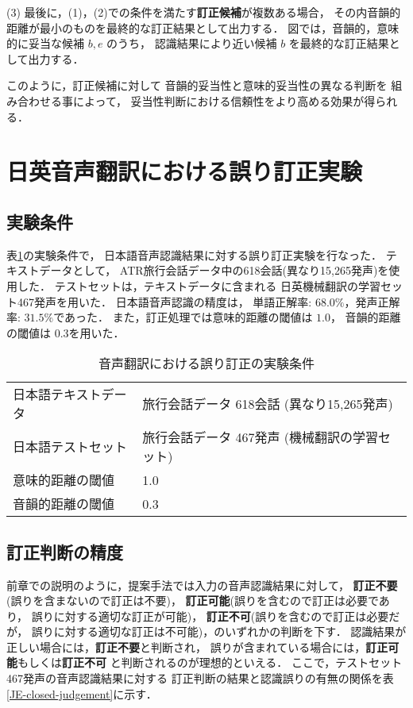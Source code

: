 (3) 最後に，(1)，(2)での条件を満たす{\bf 訂正候補}が複数ある場合，
その内音韻的距離が最小のものを最終的な訂正結果として出力する．
図では，音韻的，意味的に妥当な候補 $b, e$ のうち，
認識結果により近い候補 $b$ を最終的な訂正結果として出力する．

このように，訂正候補に対して
音韻的妥当性と意味的妥当性の異なる判断を
組み合わせる事によって，
妥当性判断における信頼性をより高める効果が得られる．



\section{日英音声翻訳における誤り訂正実験}
\label{section-JE-closed}

\subsection{実験条件}

表\ref{JE-closed-condition}の実験条件で，
日本語音声認識結果に対する誤り訂正実験を行なった．
テキストデータとして，
ATR旅行会話データ中の618会話(異なり15,265発声)を使用した．
テストセットは，テキストデータに含まれる
日英機械翻訳の学習セット467発声を用いた．
日本語音声認識の精度は，
単語正解率: $68.0\%$，発声正解率: $31.5\%$であった．
また，訂正処理では意味的距離の閾値は $1.0$，
音韻的距離の閾値は $0.3$を用いた．

\begin{table}
\begin{center}
\caption{音声翻訳における誤り訂正の実験条件}
\label{JE-closed-condition}
\begin{tabular}{|ll|}
\hline
日本語テキストデータ & 旅行会話データ 618会話 (異なり15,265発声)\\
日本語テストセット & 旅行会話データ 467発声 (機械翻訳の学習セット)\\
意味的距離の閾値 & 1.0 \\
音韻的距離の閾値 & 0.3 \\ \hline
\end{tabular}
\end{center}
\end{table}


\subsection{訂正判断の精度}

前章での説明のように，提案手法では入力の音声認識結果に対して，
{\bf 訂正不要}(誤りを含まないので訂正は不要)，
{\bf 訂正可能}(誤りを含むので訂正は必要であり，
誤りに対する適切な訂正が可能)，
{\bf 訂正不可}(誤りを含むので訂正は必要だが，
誤りに対する適切な訂正は不可能)，のいずれかの判断を下す．
認識結果が正しい場合には，{\bf 訂正不要}と判断され，
誤りが含まれている場合には，{\bf 訂正可能}もしくは{\bf 訂正不可}
と判断されるのが理想的といえる．
ここで，テストセット467発声の音声認識結果に対する
訂正判断の結果と認識誤りの有無の関係を表
\ref{JE-closed-judgement}に示す．

